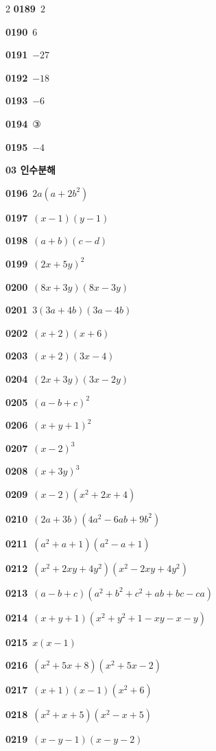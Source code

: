\documentclass[10pt,a4paper]{article}
\begin{document}
\begin{multicols}{2}
\noindent\textbf{0189}\ $2$\par
\noindent\textbf{0190}\ $6$\par
\noindent\textbf{0191}\ $-27$\par
\noindent\textbf{0192}\ $-18$\par
\noindent\textbf{0193}\ $-6$\par
\noindent\textbf{0194}\ ③\par
\noindent\textbf{0195}\ $-4$\par
\noindent\textbf{03 인수분해}\par\smallskip
\noindent\textbf{0196}\ $2a(a+2b^2)$\par
\noindent\textbf{0197}\ $(x-1)(y-1)$\par
\noindent\textbf{0198}\ $(a+b)(c-d)$\par
\noindent\textbf{0199}\ $(2x+5y)^2$\par
\noindent\textbf{0200}\ $(8x+3y)(8x-3y)$\par
\noindent\textbf{0201}\ $3(3a+4b)(3a-4b)$\par
\noindent\textbf{0202}\ $(x+2)(x+6)$\par
\noindent\textbf{0203}\ $(x+2)(3x-4)$\par
\noindent\textbf{0204}\ $(2x+3y)(3x-2y)$\par
\noindent\textbf{0205}\ $(a-b+c)^2$\par
\noindent\textbf{0206}\ $(x+y+1)^2$\par
\noindent\textbf{0207}\ $(x-2)^3$\par
\noindent\textbf{0208}\ $(x+3y)^3$\par
\noindent\textbf{0209}\ $(x-2)(x^2+2x+4)$\par
\noindent\textbf{0210}\ $(2a+3b)(4a^2-6ab+9b^2)$\par
\noindent\textbf{0211}\ $(a^2+a+1)(a^2-a+1)$\par
\noindent\textbf{0212}\ $(x^2+2xy+4y^2)(x^2-2xy+4y^2)$\par
\noindent\textbf{0213}\ $(a-b+c)(a^2+b^2+c^2+ab+bc-ca)$\par
\noindent\textbf{0214}\ $(x+y+1)(x^2+y^2+1-xy-x-y)$\par
\noindent\textbf{0215}\ $x(x-1)$\par
\noindent\textbf{0216}\ $(x^2+5x+8)(x^2+5x-2)$\par
\noindent\textbf{0217}\ $(x+1)(x-1)(x^2+6)$\par
\noindent\textbf{0218}\ $(x^2+x+5)(x^2-x+5)$\par
\noindent\textbf{0219}\ $(x-y-1)(x-y-2)$\par

\end{multicols}
\end{document}
